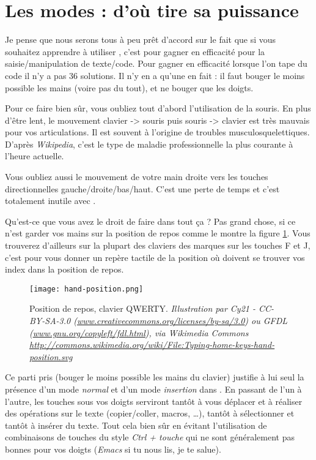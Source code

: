 \section{Les modes : d'où \vim tire sa puissance}\label{sec:modes}

Je pense que nous serons tous à peu prêt d'accord sur le fait que si vous souhaitez apprendre à utiliser \vim, c'est pour gagner en efficacité pour la saisie/manipulation de texte/code. Pour gagner en efficacité lorsque l'on tape du code il n'y a pas 36 solutions. Il n'y en a qu'une en fait : il faut bouger le moins possible les mains (voire pas du tout), et ne bouger que les doigts.

Pour ce faire bien sûr, vous oubliez tout d'abord l'utilisation de la souris. En plus d'être lent, le mouvement clavier -> souris puis souris -> clavier est très mauvais pour vos articulations. Il est souvent à l'origine de troubles musculosquelettiques. D'après \emph{Wikipedia}, c'est le type de maladie professionnelle la plus courante à l'heure actuelle.

Vous oubliez aussi le mouvement de votre main droite vers les touches directionnelles gauche/droite/bas/haut. C'est une perte de temps et c'est totalement inutile avec \vim.

Qu'est-ce que vous avez le droit de faire dans tout ça ? Pas grand chose, si ce n'est garder vos mains sur la position de repos comme le montre la figure \ref{fig:hand-position}. Vous trouverez d'ailleurs sur la plupart des claviers des marques sur les touches F et J, c'est pour vous donner un repère tactile de la position où doivent se trouver vos index dans la position de repos.

\begin{figure}%
  \texttt{[image: hand-position.png]}
  \caption{Position de repos, clavier QWERTY. \emph{Illustration par Cy21 - CC-BY-SA-3.0 (\url{www.creativecommons.org/licenses/by-sa/3.0}) ou GFDL (\url{www.gnu.org/copyleft/fdl.html}), via Wikimedia Commons \url{http://commons.wikimedia.org/wiki/File:Typing-home-keys-hand-position.svg}}}
  \label{fig:hand-position}
\end{figure}

Ce parti pris (bouger le moins possible les mains du clavier) justifie à lui seul la présence d'un mode \emph{normal} et d'un mode \emph{insertion} dans \vim. En passant de l'un à l'autre, les touches sous vos doigts serviront tantôt à vous déplacer et à réaliser des opérations sur le texte (copier/coller, macros, \ldots), tantôt à sélectionner et tantôt à insérer du texte. Tout cela bien sûr en évitant l'utilisation de combinaisons de touches du style \emph{Ctrl + touche} qui ne sont généralement pas bonnes pour vos doigts (\emph{Emacs} si tu nous lis, je te salue).

